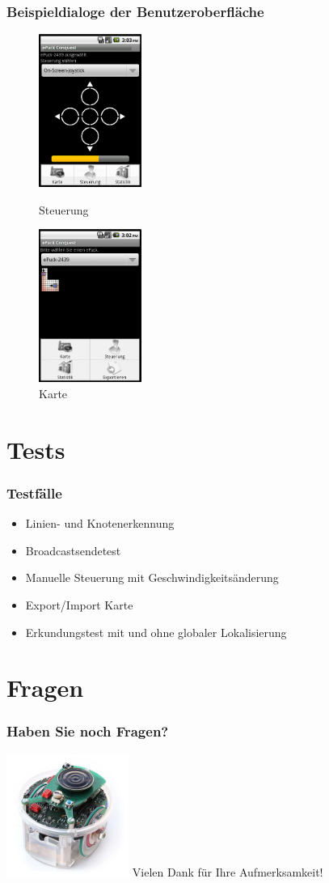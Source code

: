 \documentclass{beamer}
\begin{document}
\begin{frame}
  \frametitle{Beispieldialoge der Benutzeroberfläche}
	\begin{figure}[bp]
		\begin{minipage}[]{3.5cm}
			\includegraphics[height=5cm]{images/view1.png} 
			\caption{Steuerung}
		\end{minipage}
		\hspace{1cm}
		\begin{minipage}[]{3.5cm}
			\includegraphics[height=5cm]{images/view2.png} 
			\caption{Karte}
		\end{minipage}
	\end{figure}
\end{frame}

\section{Tests}
\begin{frame}
  \frametitle{Testfälle}
  
  	\begin{itemize}
		\item Linien- und Knotenerkennung
		\item Broadcastsendetest
		\item Manuelle Steuerung mit Geschwindigkeitsänderung
		\item Export/Import Karte
		\item Erkundungstest mit und ohne globaler Lokalisierung
	\end{itemize}  
	
\end{frame}

\section{Fragen}
\begin{frame}
	\frametitle{Haben Sie noch Fragen?}
		\includegraphics[height=4cm]{images/ende.jpg}
		\vspace{1cm}
	Vielen Dank für Ihre Aufmerksamkeit!
\end{frame}
\end{document}
